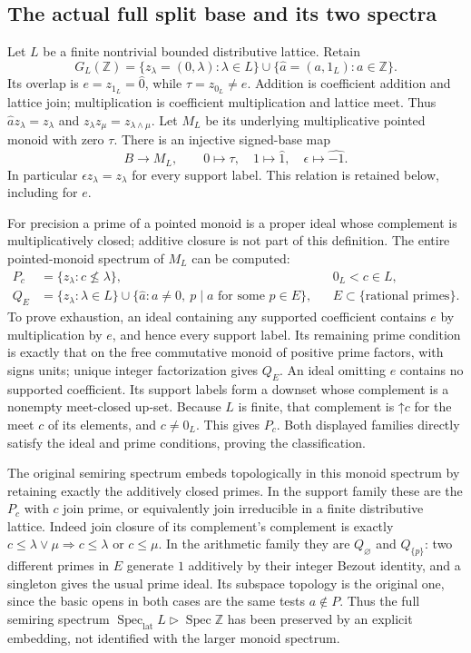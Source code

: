 \documentclass[11pt,a4paper]{article}
\theoremstyle{definition}\newtheorem{definition}[theorem]{Definition}
\newcommand{\Z}{\mathbb Z}\newcommand{\Q}{\mathbb Q}
\newcommand{\Spec}{\operatorname{Spec}}\newcommand{\SpecMon}{\operatorname{Spec}_{\mathrm{mon}}}
\newcommand{\SpecLat}{\operatorname{Spec}_{\mathrm{lat}}}
\begin{document}
\subsection{The actual full split base and its two spectra}

Let $L$ be a finite nontrivial bounded distributive lattice. Retain
\[
 G_L(\Z)=\{z_\lambda=(0,\lambda):\lambda\in L\}
       \cup\{\widehat a=(a,1_L):a\in\Z\}.
 \tag{AT2}\label{at:eq:full-semiring}
\]
Its overlap is $e=z_{1_L}=\widehat0$, while
$\tau=z_{0_L}\ne e$. Addition is coefficient addition and lattice
join; multiplication is coefficient multiplication and lattice
meet. Thus $\widehat a z_\lambda=z_\lambda$ and
$z_\lambda z_\mu=z_{\lambda\wedge\mu}$. Let $M_L$ be its
underlying multiplicative pointed monoid with zero $\tau$.
There is an injective signed-base map
\[
 B\longrightarrow M_L,
 \qquad 0\mapsto\tau,\quad1\mapsto\widehat1,
 \quad\epsilon\mapsto\widehat{-1}.
 \tag{AT3}\label{at:eq:base-map}
\]
In particular $\epsilon z_\lambda=z_\lambda$ for every support
label. This relation is retained below, including for $e$.

For precision a prime of a pointed monoid is a proper ideal whose
complement is multiplicatively closed; additive closure is not
part of this definition. The entire pointed-monoid spectrum of
$M_L$ can be computed:
\[
 \begin{aligned}
 P_c&=\{z_\lambda:c\not\le\lambda\},&&0_L<c\in L,\\
 Q_E&=\{z_\lambda:\lambda\in L\}
  \cup\{\widehat a:a\ne0,\ p\mid a\text{ for some }p\in E\},
  &&E\subset\{\text{rational primes}\}.
 \end{aligned}
 \tag{AT4}\label{at:eq:monoid-primes}
\]
To prove exhaustion, an ideal containing any supported coefficient
contains $e$ by multiplication by $e$, and hence every support
label. Its remaining prime condition is exactly that on the free
commutative monoid of positive prime factors, with signs units;
unique integer factorization gives $Q_E$. An ideal omitting $e$
contains no supported coefficient. Its support labels form a
downset whose complement is a nonempty meet-closed up-set. Because
$L$ is finite, that complement is $\mathord\uparrow c$ for the
meet $c$ of its elements, and $c\ne0_L$. This gives $P_c$.
Both displayed families directly satisfy the ideal and prime
conditions, proving the classification.

The original semiring spectrum embeds topologically in this monoid
spectrum by retaining exactly the additively closed primes. In
the support family these are the $P_c$ with $c$ join prime, or
equivalently join irreducible in a finite distributive lattice.
Indeed join closure of its complement's complement is exactly
$c\le\lambda\vee\mu\Rightarrow c\le\lambda$ or $c\le\mu$.
In the arithmetic family they are $Q_\varnothing$ and
$Q_{\{p\}}$: two different primes in $E$ generate $1$ additively
by their integer Bezout identity, and a singleton gives the usual
prime ideal. Its subspace topology is the original one, since
the basic opens in both cases are the same tests $a\notin P$.
Thus the full semiring spectrum
$\SpecLat L\triangleright\Spec\Z$ has been preserved by an
explicit embedding, not identified with the larger monoid spectrum.
\end{document}
